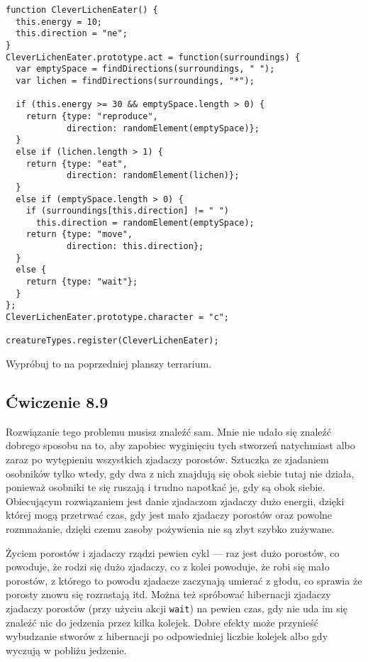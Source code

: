     
\begin{verbatim} 
function CleverLichenEater() {
  this.energy = 10;
  this.direction = "ne";
}
CleverLichenEater.prototype.act = function(surroundings) {
  var emptySpace = findDirections(surroundings, " ");
  var lichen = findDirections(surroundings, "*");

  if (this.energy >= 30 && emptySpace.length > 0) {
    return {type: "reproduce",
            direction: randomElement(emptySpace)};
  }
  else if (lichen.length > 1) {
    return {type: "eat",
            direction: randomElement(lichen)};
  }
  else if (emptySpace.length > 0) {
    if (surroundings[this.direction] != " ")
      this.direction = randomElement(emptySpace);
    return {type: "move",
            direction: this.direction};
  }
  else {
    return {type: "wait"};
  }
};
CleverLichenEater.prototype.character = "c";

creatureTypes.register(CleverLichenEater);
 \end{verbatim}
    
Wypróbuj to na poprzedniej planszy terrarium.

  
\subsection*{Ćwiczenie 8.9}
\label{sol:8.9}
    
Rozwiązanie tego problemu musisz znaleźć sam. Mnie nie udało się znaleźć dobrego sposobu na to, aby zapobiec wyginięciu tych stworzeń natychmiast albo zaraz po wytępieniu wszystkich zjadaczy porostów. Sztuczka ze zjadaniem osobników tylko wtedy, gdy dwa z nich znajdują się obok siebie tutaj nie działa, ponieważ osobniki te się ruszają i trudno napotkać je, gdy są obok siebie. Obiecującym rozwiązaniem jest danie zjadaczom zjadaczy dużo energii, dzięki której mogą przetrwać czas, gdy jest mało zjadaczy porostów oraz powolne rozmnażanie, dzięki czemu zasoby pożywienia nie są zbyt szybko zużywane.

    
Życiem porostów i zjadaczy rządzi pewien cykl — raz jest dużo porostów, co powoduje, że rodzi się dużo zjadaczy, co z kolei powoduje, że robi się mało porostów, z którego to powodu zjadacze zaczynają umierać z głodu, co sprawia że porosty znowu się rozrastają itd. Można też spróbować hibernacji zjadaczy zjadaczy porostów (przy użyciu akcji \texttt{wait}) na pewien czas, gdy nie uda im się znaleźć nic do jedzenia przez kilka kolejek. Dobre efekty może przynieść wybudzanie stworów z hibernacji po odpowiedniej liczbie kolejek albo gdy wyczują w pobliżu jedzenie.

